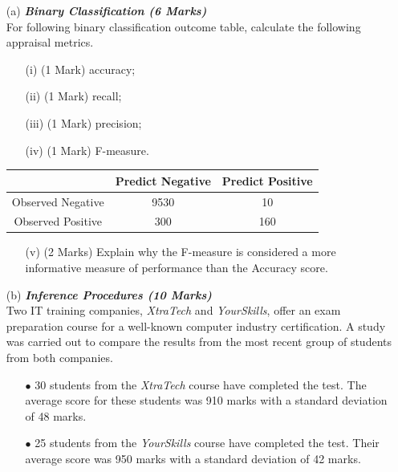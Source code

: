 \documentclass[a4paper,12pt]{article}
\begin{document}
\begin{itemize}
\begin{itemize}
\item[(a)] \textbf{\textit{Binary Classification (6 Marks)}}\\
For following binary classification outcome table, calculate the following appraisal metrics.
\begin{itemize}	
\item[(i)] (1 Mark)	accuracy;
\item[(ii)] (1 Mark)	recall;
\item[(iii)] (1 Mark)	precision;
\item[(iv)] (1 Mark)	F-measure.
\end{itemize}	

\begin{center}
\begin{tabular}{|c|c|c|}
\hline  & \phantom{spa}Predict Negative\phantom{spa} & \phantom{spa}Predict Positive\phantom{spa} \\ 
\hline\phantom{spa} Observed Negative \phantom{spa}&	9530	&	10	\\ 
\hline \phantom{spa}Observed Positive\phantom{spa} & 	300	&	160	\\ 
\hline 
\end{tabular} 
\end{center}

\begin{itemize}	
\item[(v)] (2 Marks) Explain why the F-measure is considered a more informative measure of performance than the Accuracy score.

\end{itemize}
\item[(b)] \textbf{\textit{Inference Procedures (10 Marks)}}\\
Two IT training companies, \textit{XtraTech} and \textit{YourSkills}, offer an exam preparation course for a well-known computer industry certification. A study was carried out to compare the results from the most recent group of students from both companies.
\begin{itemize}
\item[$\bullet$]30 students from the \textit{XtraTech} course have completed the test. The average score for these students was 910 marks with a standard deviation of 48 marks.

\item[$\bullet$]25 students from the \textit{YourSkills} course have completed the test. Their average score was 950 marks with a standard deviation of 42 marks.
\end{itemize}


\end{itemize}
\end{itemize}
\end{document}
